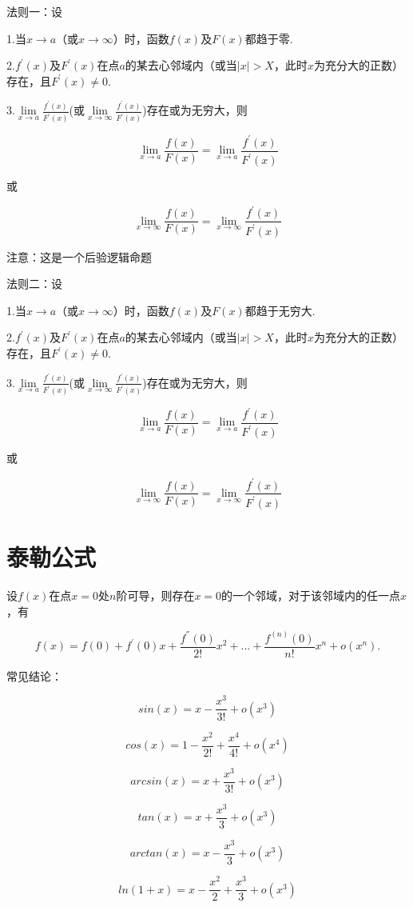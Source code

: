 \documentclass[12pt, a4paper, oneside]{ctexbook}
\begin{document}
法则一：设

1.当$x\to a$（或$x\to \infty$）时，函数$f(x)$及$F(x)$都趋于零.

2.$f^{'}(x)$及$F^{'}(x)$在点$a$的某去心邻域内（或当$|x|>X$，此时$x$为充分大的正数）存在，且$F^{'}(x) \neq 0$.

3.$\lim\limits_{x \to a} \frac{f^{'}(x)}{F^{'}(x)}$(或$\lim\limits_{x \to \infty} \frac{f^{'}(x)}{F^{'}(x)}$)存在或为无穷大，则

\[\lim\limits_{x \to a} \frac{f(x)}{F(x)}=\lim\limits_{x \to a} \frac{f^{'}(x)}{F^{'}(x)}\]

或

\[\lim\limits_{x \to \infty} \frac{f(x)}{F(x)}=\lim\limits_{x \to \infty} \frac{f^{'}(x)}{F^{'}(x)}\]

注意：这是一个后验逻辑命题

法则二：设

1.当$x\to a$（或$x\to \infty$）时，函数$f(x)$及$F(x)$都趋于无穷大.

2.$f^{'}(x)$及$F^{'}(x)$在点$a$的某去心邻域内（或当$|x|>X$，此时$x$为充分大的正数）存在，且$F^{'}(x) \neq 0$.

3.$\lim\limits_{x \to a} \frac{f^{'}(x)}{F^{'}(x)}$(或$\lim\limits_{x \to \infty} \frac{f^{'}(x)}{F^{'}(x)}$)存在或为无穷大，则

\[\lim\limits_{x \to a} \frac{f(x)}{F(x)}=\lim\limits_{x \to a} \frac{f^{'}(x)}{F^{'}(x)}\]

或

\[\lim\limits_{x \to \infty} \frac{f(x)}{F(x)}=\lim\limits_{x \to \infty} \frac{f^{'}(x)}{F^{'}(x)}\]

\section{泰勒公式}

设$f(x)$在点$x=0$处$n$阶可导，则存在$x=0$的一个邻域，对于该邻域内的任一点$x$，有

\[f(x)=f(0)+f^{'}(0)x+\frac{f^{''}(0)}{2!}x^2 + ... + \frac{f^{(n)}(0)}{n!}x^n + o(x^n).\]

常见结论：

\[sin(x)=x-\frac{x^3}{3!}+o(x^3)\]

\[cos(x)=1-\frac{x^2}{2!}+\frac{x^4}{4!}+o(x^4)\]

\[arcsin(x)=x+\frac{x^3}{3!}+o(x^3)\]

\[tan(x)=x+\frac{x^3}{3}+o(x^3)\]

\[arctan(x)=x-\frac{x^3}{3}+o(x^3)\]

\[ln(1+x)=x-\frac{x^2}{2}+\frac{x^3}{3}+o(x^3)\]
\end{document}
